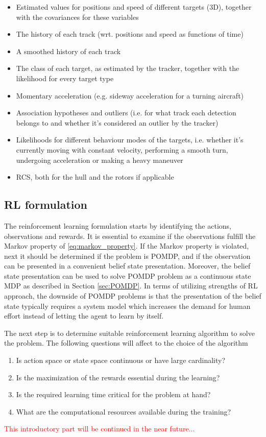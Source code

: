 \documentclass[english, 12pt, a4paper, elec, utf8, a-1b, online]{aaltothesis}
\begin{document}
\begin{itemize}
    \item Estimated values for positions and speed of different targets (3D), together with the covariances for these variables
    \item The history of each track (wrt. positions and speed as functions of time)
    \item A smoothed history of each track
    \item The class of each target, as estimated by the tracker, together with the likelihood for every target type
    \item Momentary acceleration (e.g. sideway acceleration for a turning aircraft)
    \item Association hypotheses and outliers (i.e. for what track each detection belongs to and whether it's considered an outlier by the tracker)
    \item Likelihoods for different behaviour modes of the targets, i.e. whether it's currently moving with constant velocity, performing a smooth turn, undergoing acceleration or making a heavy maneuver
    \item RCS, both for the hull and the rotors if applicable
\end{itemize}

\subsection{RL formulation}\label{sec:RL_formulation}

The reinforcement learning formulation starts by identifying the actions, observations and rewards.
It is essential to examine if the observations fulfill the Markov property of \eqref{eq:markov_property}.
If the Markov property is violated, next it should be determined if the problem is POMDP, and if the observation can be presented in a convenient belief state presentation.
Moreover, the belief state presentation can be used to solve POMDP problem as a continuous state MDP as described in Section \ref{sec:POMDP}.
In terms of utilizing strengths of RL approach, the downside of POMDP problems is that the presentation of the belief state typically requires a system model which increases the demand for human effort instead of letting the agent to learn by itself.

The next step is to determine suitable reinforcement learning algorithm to solve the problem.
The following questions will affect to the choice of the algorithm
\begin{enumerate}
    \item Is action space or state space continuous or have large cardinality? \label{enum:question_spaces}
    \item Is the maximization of the rewards essential during the learning? \label{enum:on_off_policy}
    \item Is the required learning time critical for the problem at hand? \label{enum:question_learning_speed}
    \item What are the computational resources available during the training? \label{enum:question_resources}
\end{enumerate}
\textcolor{red}{This introductory part will be continued in the near future...}
\end{document}
